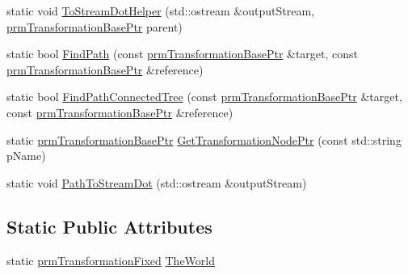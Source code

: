 \begin{DoxyCompactItemize}
static void \hyperlink{classprm_transformation_manager_a22d0b0f7d90c74e21bde7bfaf5729392}{To\+Stream\+Dot\+Helper} (std\+::ostream \&output\+Stream, \hyperlink{prm_transformation_base_8h_a881a6a7d2191474974cdf36d79e1df08}{prm\+Transformation\+Base\+Ptr} parent)
\item 
static bool \hyperlink{classprm_transformation_manager_acf4eabfe454d2e25d2849e90351287de}{Find\+Path} (const \hyperlink{prm_transformation_base_8h_a881a6a7d2191474974cdf36d79e1df08}{prm\+Transformation\+Base\+Ptr} \&target, const \hyperlink{prm_transformation_base_8h_a881a6a7d2191474974cdf36d79e1df08}{prm\+Transformation\+Base\+Ptr} \&reference)
\item 
static bool \hyperlink{classprm_transformation_manager_ae584d612affb33042f0e3c48f84bc8f6}{Find\+Path\+Connected\+Tree} (const \hyperlink{prm_transformation_base_8h_a881a6a7d2191474974cdf36d79e1df08}{prm\+Transformation\+Base\+Ptr} \&target, const \hyperlink{prm_transformation_base_8h_a881a6a7d2191474974cdf36d79e1df08}{prm\+Transformation\+Base\+Ptr} \&reference)
\item 
static \hyperlink{prm_transformation_base_8h_a881a6a7d2191474974cdf36d79e1df08}{prm\+Transformation\+Base\+Ptr} \hyperlink{classprm_transformation_manager_a8632cf33976e0a3d07b6d333d2de512c}{Get\+Transformation\+Node\+Ptr} (const std\+::string p\+Name)
\item 
static void \hyperlink{classprm_transformation_manager_a850c9d896cb8eb8e2570e3f8bbe7700b}{Path\+To\+Stream\+Dot} (std\+::ostream \&output\+Stream)
\end{DoxyCompactItemize}
\subsection*{Static Public Attributes}
\begin{DoxyCompactItemize}
\item 
static \hyperlink{classprm_transformation_fixed}{prm\+Transformation\+Fixed} \hyperlink{classprm_transformation_manager_a565dcc8b21bc6ffa31c62c638b540867}{The\+World}
\end{DoxyCompactItemize}
